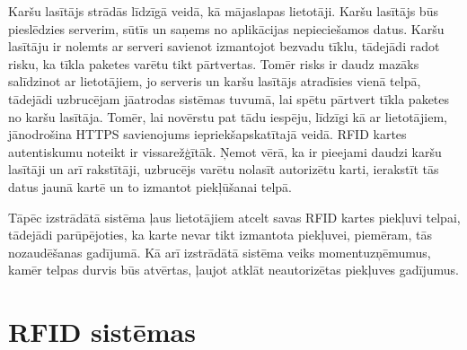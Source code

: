 Karšu lasītājs strādās līdzīgā veidā, kā mājaslapas lietotāji. Karšu lasītājs būs pieslēdzies serverim, sūtīs un saņems no aplikācijas nepieciešamos datus. Karšu lasītāju ir nolemts ar serveri savienot izmantojot bezvadu tīklu, tādejādi radot risku, ka tīkla paketes varētu tikt pārtvertas. Tomēr risks ir daudz mazāks salīdzinot ar lietotājiem, jo serveris un karšu lasītājs atradīsies vienā telpā, tādejādi uzbrucējam jāatrodas sistēmas tuvumā, lai spētu pārtvert tīkla paketes no karšu lasītāja. Tomēr, lai novērstu pat tādu iespēju, līdzīgi kā ar lietotājiem, jānodrošina HTTPS savienojums iepriekšapskatītajā veidā.
RFID kartes autentiskumu noteikt ir vissarežģītāk. Ņemot vērā, ka ir pieejami daudzi karšu lasītāji un arī rakstītāji, uzbrucējs varētu nolasīt autorizētu karti, ierakstīt tās datus jaunā kartē un to izmantot piekļūšanai telpā.

Tāpēc izstrādātā sistēma ļaus lietotājiem atcelt savas RFID kartes piekļuvi telpai, tādejādi parūpējoties, ka karte nevar tikt izmantota piekļuvei, piemēram, tās nozaudēšanas gadījumā. Kā arī izstrādātā sistēma veiks momentuzņēmumus, kamēr telpas durvis būs atvērtas, ļaujot atklāt neautorizētas piekļuves gadījumus.

\section{RFID sistēmas}
